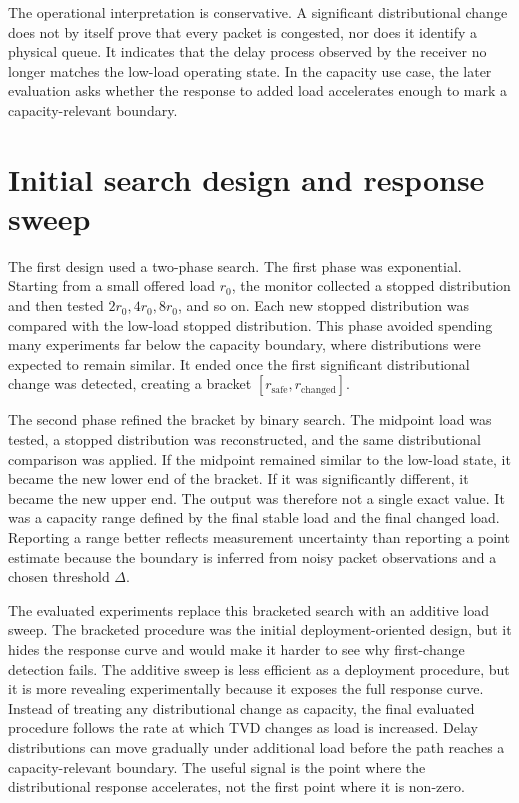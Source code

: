 The operational interpretation is conservative. A significant distributional change does not by itself prove that every packet is congested, nor does it identify a physical queue. It indicates that the delay process observed by the receiver no longer matches the low-load operating state. In the capacity use case, the later evaluation asks whether the response to added load accelerates enough to mark a capacity-relevant boundary.

\section{Initial search design and response sweep}

The first design used a two-phase search. The first phase was exponential. Starting from a small offered load \(r_0\), the monitor collected a stopped distribution and then tested \(2r_0,4r_0,8r_0\), and so on. Each new stopped distribution was compared with the low-load stopped distribution. This phase avoided spending many experiments far below the capacity boundary, where distributions were expected to remain similar. It ended once the first significant distributional change was detected, creating a bracket \([r_{\mathrm{safe}},r_{\mathrm{changed}}]\).

The second phase refined the bracket by binary search. The midpoint load was tested, a stopped distribution was reconstructed, and the same distributional comparison was applied. If the midpoint remained similar to the low-load state, it became the new lower end of the bracket. If it was significantly different, it became the new upper end. The output was therefore not a single exact value. It was a capacity range defined by the final stable load and the final changed load. Reporting a range better reflects measurement uncertainty than reporting a point estimate because the boundary is inferred from noisy packet observations and a chosen threshold \(\Delta\).

The evaluated experiments replace this bracketed search with an additive load sweep. The bracketed procedure was the initial deployment-oriented design, but it hides the response curve and would make it harder to see why first-change detection fails. The additive sweep is less efficient as a deployment procedure, but it is more revealing experimentally because it exposes the full response curve. Instead of treating any distributional change as capacity, the final evaluated procedure follows the rate at which TVD changes as load is increased. Delay distributions can move gradually under additional load before the path reaches a capacity-relevant boundary. The useful signal is the point where the distributional response accelerates, not the first point where it is non-zero.

